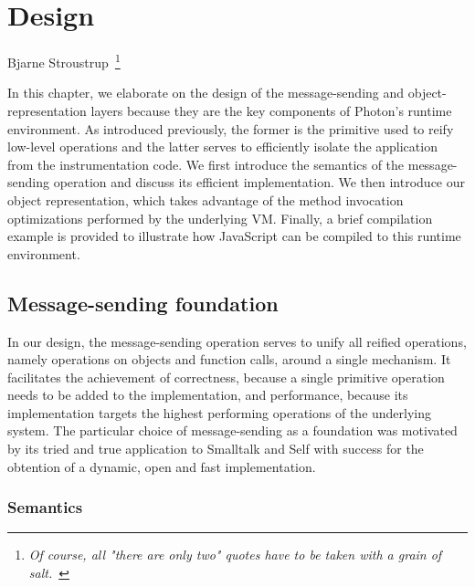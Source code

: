 \chapter{Design}
\label{chap:Design}
%
%
{Bjarne Stroustrup~\footnote{\textit{Of course, all "there are only
two" quotes have to be taken with a grain of salt.}~\cite{stroustrup}}}


In this chapter, we elaborate on the design of the message-sending and
object-representation layers because they are the key components of Photon's
runtime environment. As introduced previously, the former is the primitive used
to reify low-level operations and the latter serves to efficiently isolate the
application from the instrumentation code.  We first introduce the semantics of
the message-sending operation and discuss its efficient implementation. We then
introduce our object representation, which takes advantage of the method
invocation optimizations performed by the underlying VM. Finally, a brief
compilation example is provided to illustrate how JavaScript can be compiled to
this runtime environment.

\section{Message-sending foundation}
In our design, the message-sending operation serves to unify all reified
operations, namely operations on objects and function calls, around a single
mechanism. It facilitates the achievement of correctness, because a single
primitive operation needs to be added to the implementation, and performance,
because its implementation targets the highest performing operations of the
underlying system.  The particular choice of message-sending as a foundation
was motivated by its tried and true application to Smalltalk and Self with
success for the obtention of a dynamic, open and fast implementation. 

\subsection{Semantics}

